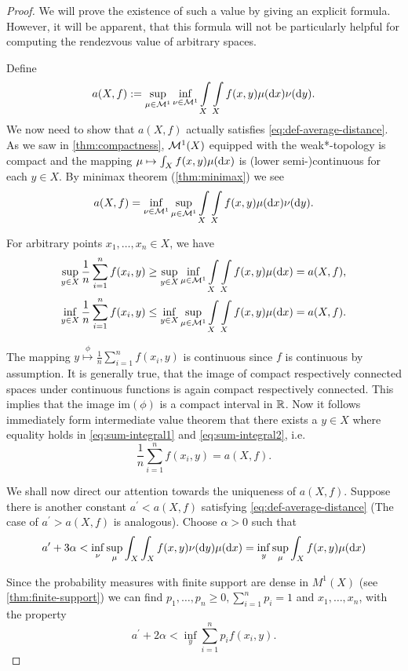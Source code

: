 \begin{proof}
	We will prove the existence of such a value by giving an explicit formula. However, it will be apparent, that this formula will not be particularly helpful for computing the rendezvous value of arbitrary spaces.
	
	Define
	\[
	a(X,f):=\sup_{\mu\in\mathcal{M}^1}\inf_{\nu\in\mathcal{M}^1} \int\limits_X\int\limits_X f(x,y)\mu(\mathrm{d}x)\nu(\mathrm{d}y).
	\]
	We now need to show that $a(X,f)$ actually satisfies \autoref{eq:def-average-distance}. As we saw in \autoref{thm:compactness},
	$\mathcal{M}^1(X)$ equipped with the weak*-topology is compact and the mapping $\mu\mapsto\int_Xf(x,y)\mu(\mathrm{d}x)$ is (lower semi-)continuous for each $y\in X$. 
	By minimax theorem (\autoref{thm:minimax}) we
	see 
	\[
	a(X,f)=\inf_{\nu\in\mathcal{M}^1}\sup_{\mu\in\mathcal{M}^1} \int\limits_X\int\limits_X f(x,y)\mu(\mathrm{d}x)\nu(\mathrm{d}y).
	\]
	
	For arbitrary points $x_1,\dots,x_n\in X$, we have
	\begin{align}\label{eq:sum-integral1}
		\sup_{y\in X}\frac{1}{n}\sum_{i=1}^{n}f(x_i,y)&\geq\sup_{y\in X}\inf_{\mu\in\mathcal{M}^1} \int\limits_X\int\limits_X f(x,y)\mu(\mathrm{d}x)=a(X,f),
		\\\label{eq:sum-integral2}
		\inf_{y\in X}\frac{1}{n}\sum_{i=1}^{n}f(x_i,y)&\leq\inf_{y\in X}\sup_{\mu\in\mathcal{M}^1} \int\limits_X\int\limits_X f(x,y)\mu(\mathrm{d}x)=a(X,f).
	\end{align}
	
	The mapping $y\overset{\phi}{\mapsto} \frac{1}{n}\sum_{i=1}^{n}f(x_i,y)$ is continuous since $f$ is continuous by assumption. 
	It is generally true, that the image of compact respectively connected spaces under continuous functions is again compact respectively connected. 
	This implies that the image $\mathrm{im}(\phi)$ is a compact interval in $\mathbb{R}$. Now it follows immediately form intermediate value theorem that there exists a $y\in X$ where equality holds in \autoref{eq:sum-integral1} and \ref{eq:sum-integral2}, i.e.
	\[
	\frac{1}{n}\sum_{i=1}^{n}f(x_i,y)=a(X,f).
	\]
	
	We shall now direct our attention towards the uniqueness of $a(X,f)$.
	Suppose there is another constant $a^\prime<a(X,f)$ satisfying \autoref{eq:def-average-distance} (The case of $a^\prime>a(X,f)$ is analogous). Choose $\alpha>0$ such that 
	\[
	a^\prime+3\alpha<\inf_\nu\sup_\mu\int_X\int_Xf(x,y)\nu(\mathrm{d}y)\mu(\mathrm{d}x)=\inf_y\sup_\mu\int_Xf(x,y)\mu(\mathrm{d}x)
	\]
	
	Since the probability measures with finite support are dense in $M^1(X)$ (see \autoref{thm:finite-support}) we can find $p_1,\dots,p_n\geq 0, \sum_{i=1}^{n}p_i=1$ and $x_1,\dots,x_n$, with the property
	\begin{equation}\label{eq:uniqueness-finite}
	a^\prime+2\alpha<\inf_y\sum_{i=1}^{n}p_if(x_i,y).
	\end{equation}
	

\end{proof}
